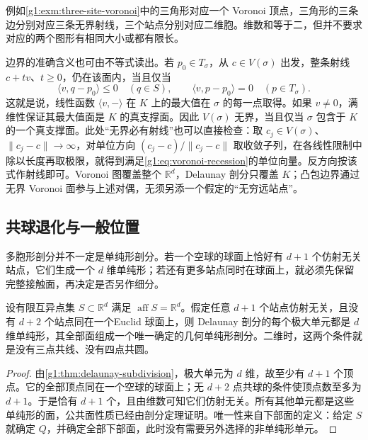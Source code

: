 例如\cref{g1:exm:three-site-voronoi}中的三角形对应一个 Voronoi 顶点，三角形的三条边分别对应三条无界射线，三个站点分别对应二维胞。维数和等于二，但并不要求对应的两个图形有相同大小或都有限长。

\ProseParagraphBreak

边界的准确含义也可由不等式读出。若 \(p_0\in T_\sigma\)，从 \(c\in V(\sigma)\) 出发，整条射线 \(c+tv\)、\(t\ge0\)，仍在该面内，当且仅当
\begin{equation}\label{g1:eq:voronoi-recession}
	\langle v,q-p_0\rangle\le0\quad(q\in S),
	\qquad
	\langle v,p-p_0\rangle=0\quad(p\in T_\sigma).
\end{equation}
这就是说，线性函数 \(\langle v,-\rangle\) 在 \(K\) 上的最大值在 \(\sigma\) 的每一点取得。如果 \(v\ne0\)，满维性保证其最大值面是 \(K\) 的真支撑面。因此 \(V(\sigma)\) 无界，当且仅当 \(\sigma\) 包含于 \(K\) 的一个真支撑面。此处“无界必有射线”也可以直接检查：取 \(c_j\in V(\sigma)\)、\(\lVert c_j-c\rVert\to\infty\)，对单位方向 \((c_j-c)/\lVert c_j-c\rVert\) 取收敛子列，在各线性限制中除以长度再取极限，就得到满足\eqref{g1:eq:voronoi-recession}的单位向量。反方向按该式作射线即可。Voronoi 图覆盖整个 \(\mathbb R^d\)，Delaunay 剖分只覆盖 \(K\)；凸包边界通过无界 Voronoi 面参与上述对偶，无须另添一个假定的“无穷远站点”。

\subsection{共球退化与一般位置}
\label{g1:subsec:B02:03}

多胞形剖分并不一定是单纯形剖分。若一个空球的球面上恰好有 \(d+1\) 个仿射无关站点，它们生成一个 \(d\) 维单纯形；若还有更多站点同时在球面上，就必须先保留完整接触面，再决定是否另作细分。

\begin{proposition}\label{g1:prop:delaunay-general-position}
	设有限互异点集 \(S\subset\mathbb R^d\) 满足 \(\operatorname{aff}S=\mathbb R^d\)。假定任意 \(d+1\) 个站点仿射无关，且没有 \(d+2\) 个站点同在一个Euclid 球面上，则 Delaunay 剖分的每个极大单元都是 \(d\) 维单纯形，其全部面组成一个唯一确定的几何单纯形剖分。二维时，这两个条件就是没有三点共线、没有四点共圆。
\end{proposition}
\begin{proof}
	由\cref{g1:thm:delaunay-subdivision}，极大单元为 \(d\) 维，故至少有 \(d+1\) 个顶点。它的全部顶点同在一个空球的球面上；无 \(d+2\) 点共球的条件使顶点数至多为 \(d+1\)。于是恰有 \(d+1\) 个，且由维数可知它们仿射无关。所有其他单元都是这些单纯形的面，公共面性质已经由剖分定理证明。唯一性来自下部面的定义：给定 \(S\) 就确定 \(Q\)，并确定全部下部面，此时没有需要另外选择的非单纯形单元。
\end{proof}

